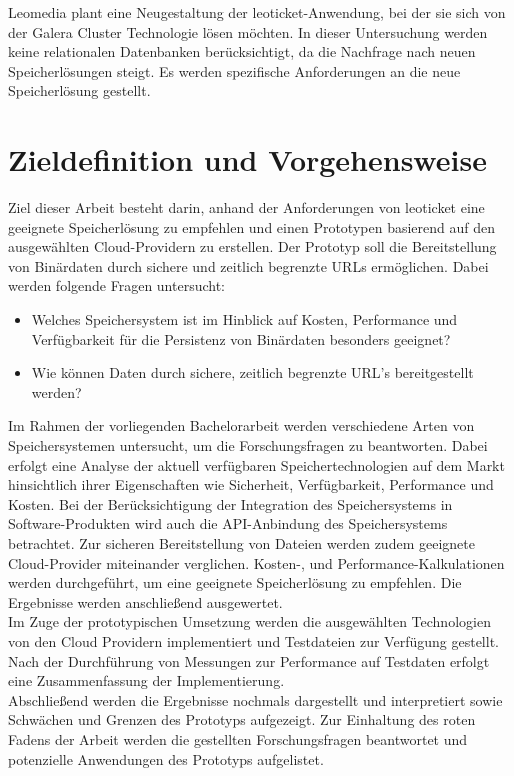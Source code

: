 Leomedia plant eine Neugestaltung der leoticket-Anwendung, bei der sie sich von der Galera Cluster Technologie lösen möchten. In dieser Untersuchung werden keine relationalen Datenbanken berücksichtigt, da die Nachfrage nach neuen Speicherlösungen steigt. Es werden spezifische Anforderungen an die neue Speicherlösung gestellt.

\newpage

\section{Zieldefinition und Vorgehensweise}

Ziel dieser Arbeit besteht darin, anhand der Anforderungen von leoticket eine geeignete Speicherlösung zu empfehlen und einen Prototypen basierend auf den ausgewählten Cloud-Providern zu erstellen. Der Prototyp soll die Bereitstellung von Binärdaten durch sichere und zeitlich begrenzte URLs ermöglichen. Dabei werden folgende Fragen untersucht:

\begin{itemize}
	\item Welches Speichersystem ist im Hinblick auf Kosten, Performance und Verfügbarkeit für die Persistenz von Binärdaten besonders geeignet? 
	\item Wie können Daten durch sichere, zeitlich begrenzte URL's bereitgestellt werden?
\end{itemize}

Im Rahmen der vorliegenden Bachelorarbeit werden verschiedene Arten von Speichersystemen untersucht, um die Forschungsfragen zu beantworten. Dabei erfolgt eine Analyse der aktuell verfügbaren Speichertechnologien auf dem Markt hinsichtlich ihrer Eigenschaften wie Sicherheit, Verfügbarkeit, Performance und Kosten. Bei der Berücksichtigung der Integration des Speichersystems in Software-Produkten wird auch die API-Anbindung des Speichersystems betrachtet. Zur sicheren Bereitstellung von Dateien werden zudem geeignete Cloud-Provider miteinander verglichen. Kosten-, und Performance-Kalkulationen werden durchgeführt, um eine geeignete Speicherlösung zu empfehlen. Die Ergebnisse werden anschließend ausgewertet.\\

Im Zuge der prototypischen Umsetzung werden die ausgewählten Technologien von den Cloud Providern implementiert und Testdateien zur Verfügung gestellt. Nach der Durchführung von Messungen zur Performance auf Testdaten erfolgt eine Zusammenfassung der Implementierung.\\

Abschließend werden die Ergebnisse nochmals dargestellt und interpretiert sowie Schwächen und Grenzen des Prototyps aufgezeigt. Zur Einhaltung des roten Fadens der Arbeit werden die gestellten Forschungsfragen beantwortet und potenzielle Anwendungen des Prototyps aufgelistet.

